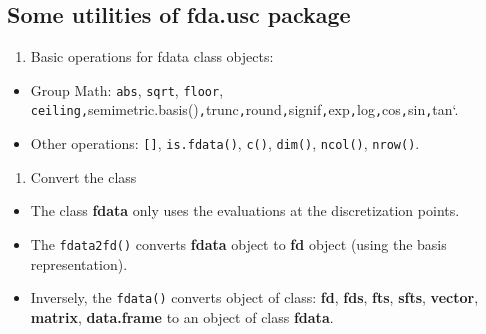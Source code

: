 \documentclass[
]{book}
\newenvironment{Shaded}{\begin{snugshade}}{\end{snugshade}}
\newcommand{\FunctionTok}[1]{\textcolor[rgb]{0.00,0.00,0.00}{#1}}
\newcommand{\NormalTok}[1]{#1}
\newcommand{\SpecialCharTok}[1]{\textcolor[rgb]{0.00,0.00,0.00}{#1}}
\providecommand{\tightlist}{%
  \setlength{\itemsep}{0pt}\setlength{\parskip}{0pt}}
\begin{document}
\hypertarget{some-utilities-of-fda.usc-package}{%
\subsection{Some utilities of fda.usc package}\label{some-utilities-of-fda.usc-package}}

\begin{enumerate}
\def\labelenumi{\arabic{enumi}.}
\tightlist
\item
  Basic operations for fdata class objects:
\end{enumerate}

\begin{itemize}
\tightlist
\item
  Group Math: \texttt{abs}, \texttt{sqrt}, \texttt{floor}, \texttt{ceiling,}semimetric.basis()\texttt{,}trunc\texttt{,}round\texttt{,}signif\texttt{,}exp\texttt{,}log\texttt{,}cos\texttt{,}sin\texttt{,}tan`.
\item
  Other operations: \texttt{{[}{]}}, \texttt{is.fdata()}, \texttt{c()}, \texttt{dim()}, \texttt{ncol()}, \texttt{nrow()}.
\end{itemize}

\begin{Shaded}
\end{Shaded}

\begin{enumerate}
\def\labelenumi{\arabic{enumi}.}
\setcounter{enumi}{1}
\tightlist
\item
  Convert the class
\end{enumerate}

\begin{itemize}
\item
  The class \textbf{fdata} only uses the evaluations at the discretization points.
\item
  The \texttt{fdata2fd()} converts \textbf{fdata} object to \textbf{fd} object (using the basis representation).
\item
  Inversely, the \texttt{fdata()} converts object of class: \textbf{fd}, \textbf{fds}, \textbf{fts}, \textbf{sfts}, \textbf{vector}, \textbf{matrix}, \textbf{data.frame} to an object of class \textbf{fdata}.
\end{itemize}
\end{document}

